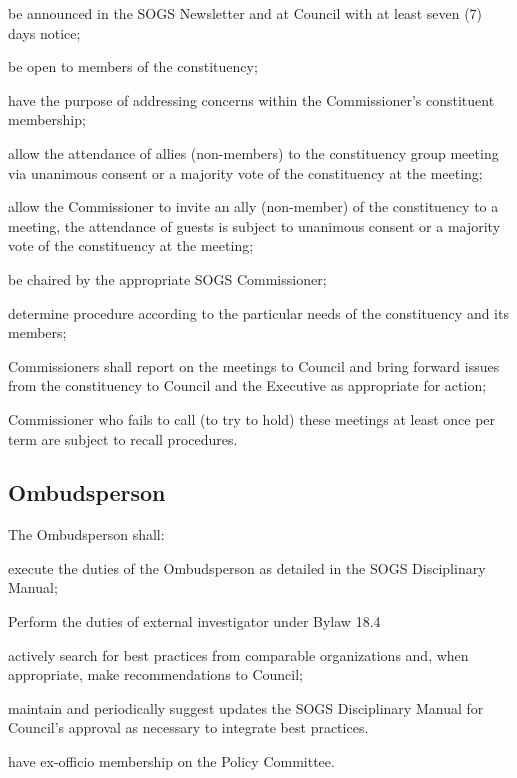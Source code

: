 \begin{longenum}[ label*=\thesubsection.\arabic*., align=left]
\begin{longenum}[ label*=\arabic*., align=left]
\item be announced in the SOGS Newsletter and at Council with at least seven (7) days notice;
\item be open to members of the constituency;
\item have the purpose of addressing concerns within the Commissioner's constituent membership;
\item allow the attendance of allies (non-members) to the constituency group meeting via unanimous consent or a majority vote of the constituency at the meeting;
\item allow the Commissioner to invite an ally (non-member) of the constituency to a meeting, the attendance of guests is subject to unanimous consent or a majority vote of the constituency at the meeting;
\item be chaired by the appropriate SOGS Commissioner;
\item determine procedure according to the particular needs of the constituency and its members;
\end{longenum}
\item Commissioners shall report on the meetings to Council and bring forward issues from the constituency to Council and the Executive as appropriate for action;
\item Commissioner who fails to call (to try to hold) these meetings at least once per term are subject to recall procedures.
\end{longenum}


\subsection{Ombudsperson}
The Ombudsperson shall:
\begin{longenum}[ label*=\thesubsection.\arabic*., align=left]


\item execute the duties of the Ombudsperson as detailed in the SOGS Disciplinary Manual; 
\item Perform the duties of external investigator under Bylaw 18.4
\item actively search for best practices from comparable organizations and, when appropriate, make recommendations to Council;
\item maintain and periodically suggest updates the SOGS Disciplinary Manual for Council's approval
as necessary to integrate best practices.
\item have ex-officio membership on the Policy Committee.
\end{longenum}
